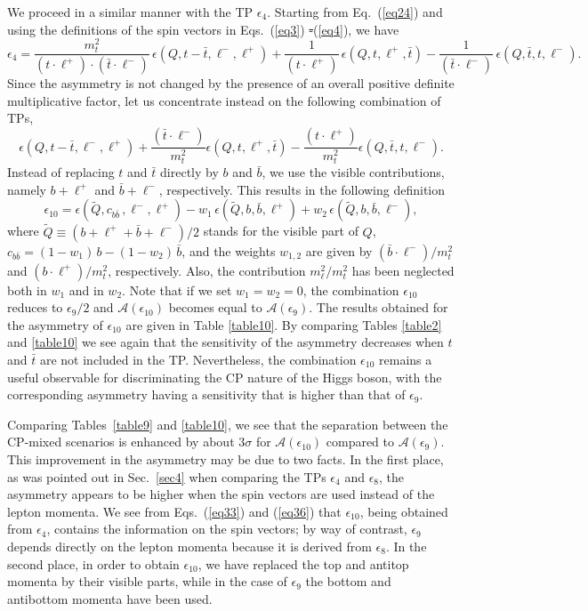 \documentclass[aps,preprint,tightenlines,floatfix,superscriptaddress,nofootinbib,showpacs]{revtex4-1}
\def\beq{\begin{equation}}
\def\eeq{\end{equation}}
\def\tbar{\bar{t}}
\def\bbar{\bar{b}}
\providecommand{\DIFadd}[1]{{\protect\color{blue}\uwave{#1}}} %
\providecommand{\DIFdel}[1]{{\protect\color{red}\sout{#1}}}                      %
\providecommand{\DIFaddbegin}{} %
\providecommand{\DIFaddend}{} %
\providecommand{\DIFdelbegin}{} %
\providecommand{\DIFdelend}{} %
\begin{document}
We proceed in a similar manner with the TP $\epsilon_4$. Starting from
Eq.~(\ref{eq24}) and using the definitions of the spin vectors
in Eqs.~(\ref{eq3}) \DIFdelbegin \DIFdel{-}\DIFdelend \DIFaddbegin \DIFadd{and }\DIFaddend (\ref{eq4}), we have
%
\beq
\label{eq34}
\epsilon_4 = \frac{m^2_t}{(t\cdot\ell^+)\cdot(\tbar\cdot\ell^-)}\,\epsilon(Q,t-\tbar,\ell^-,\ell^+)+\frac{1}{(t\cdot\ell^+)}\,\epsilon(Q,t,\ell^+,\tbar)-\frac{1}{(\tbar\cdot \ell^-)}\,\epsilon(Q,\tbar,t,\ell^-).
\eeq
%
Since the asymmetry is not changed by the presence
of an overall positive definite multiplicative
factor, let us concentrate instead on the following combination
of TPs,
%
\beq
\label{eq35}
\epsilon(Q,t-\tbar,\ell^-,\ell^+)+\frac{(\tbar\cdot \ell^-)}{m^2_t}\epsilon(Q,t,\ell^+,\tbar)-\frac{(t\cdot\ell^+)}{m^2_t}\epsilon(Q,\tbar,t,\ell^-).
\eeq
Instead of replacing $t$ and $\tbar$ directly by $b$ and $\bbar$,
we use the visible contributions, namely $b+\ell^+$ and $\bbar +\ell^-$,
respectively. This results in the following definition
%
\beq
\label{eq36}
\epsilon_{10}=\epsilon(\tilde{Q},c_{b\bbar}\,,\ell^-,\ell^+)-w_1\,\epsilon(\tilde{Q},b,\bbar,\ell^+)+w_2\,\epsilon(\tilde{Q},b,\bbar,\ell^-),
\eeq
%
where $\tilde{Q}\equiv (b+\ell^+\!+\bbar +\ell^-)/2$ stands for the
visible part of $Q$, $c_{b\bbar}=(1-w_1)\,b-(1-w_2)\,\bbar$, and the
weights $w_{1,2}$ are given by $(\bbar\cdot \ell^-)/m^2_t $ and
$(b\cdot \ell^+)/m^2_t$, respectively. Also, the contribution
$m^2_{\ell}/m^2_t$ has been neglected both in $w_1$ and in $w_2$. Note
that if we set $w_1=w_2=0$, the combination $\epsilon_{10}$ reduces to
$\epsilon_9 /2$ and $\mathcal{A}(\epsilon_{10})$ becomes equal to
$\mathcal{A}(\epsilon_9)$. The results obtained for the asymmetry of
$\epsilon_{10}$ are given in Table \ref{table10}. By comparing Tables
\ref{table2} and \ref{table10} we see again that the sensitivity of
the asymmetry decreases when $t$ and $\tbar$ are not included in the
TP. Nevertheless, the combination $\epsilon_{10}$ remains a useful
observable for discriminating the $\mathrm{CP}$ nature of the Higgs
boson, with the corresponding asymmetry having a sensitivity that is
higher than that of $\epsilon_9$.

Comparing
Tables~\ref{table9} and \ref{table10}, we see that the
separation between the $\mathrm{CP}$-mixed scenarios is enhanced by
about $3\sigma$ for $\mathcal{A}(\epsilon_{10})$ compared
  to $\mathcal{A}(\epsilon_{9})$.
    This improvement in the asymmetry may be due to two facts. In the first
place, as was pointed out in Sec.~\ref{sec4} when comparing the TPs
$\epsilon_4$ and $\epsilon_8$, the asymmetry appears to be higher when
the spin vectors are used instead of the lepton momenta.  We see
from Eqs.~(\ref{eq33}) and (\ref{eq36}) that $\epsilon_{10}$, being
obtained from $\epsilon_4$, contains the information on the spin
vectors; by way of contrast, $\epsilon_9$ depends directly on the
lepton momenta because it is derived from $\epsilon_8$. In the second
place, in order to obtain $\epsilon_{10}$, we have replaced
the top and antitop momenta by their 
visible parts, while in the case of $\epsilon_9$ the bottom and
antibottom momenta have been used.
\end{document}
